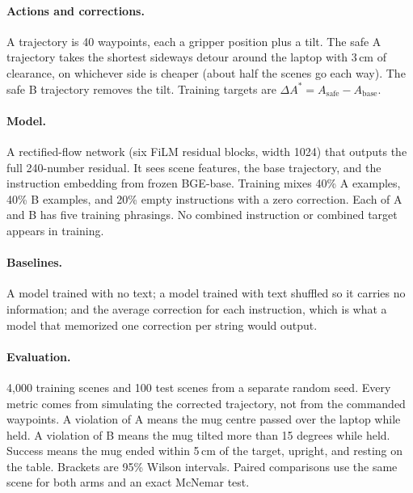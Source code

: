 \documentclass[11pt]{article}
\begin{document}
\paragraph{Actions and corrections.} A trajectory is 40 waypoints, each a gripper position plus a
tilt. The safe A trajectory takes the shortest sideways detour around the laptop with 3\,cm of
clearance, on whichever side is cheaper (about half the scenes go each way). The safe B
trajectory removes the tilt. Training targets are $\Delta A^* = A_{\text{safe}} - A_{\text{base}}$.

\paragraph{Model.} A rectified-flow network (six FiLM residual blocks, width 1024) that outputs
the full 240-number residual. It sees scene features, the base trajectory, and the instruction
embedding from frozen BGE-base. Training mixes 40\% A examples, 40\% B examples, and 20\% empty
instructions with a zero correction. Each of A and B has five training phrasings. No combined
instruction or combined target appears in training.

\paragraph{Baselines.} A model trained with no text; a model trained with text shuffled so it
carries no information; and the average correction for each instruction, which is what a model
that memorized one correction per string would output.

\paragraph{Evaluation.} 4{,}000 training scenes and 100 test scenes from a separate random seed.
Every metric comes from simulating the corrected trajectory, not from the commanded waypoints.
A violation of A means the mug centre passed over the laptop while held. A violation of B means
the mug tilted more than 15 degrees while held. Success means the mug ended within 5\,cm of the
target, upright, and resting on the table. Brackets are 95\% Wilson intervals. Paired
comparisons use the same scene for both arms and an exact McNemar test.
\end{document}
